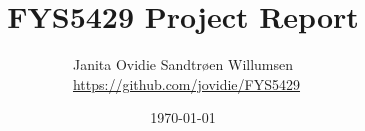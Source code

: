 \documentclass[reprint,english,notitlepage]{revtex4-1}  %
\begin{document}
% 


% 
\title{FYS5429 Project Report}
\author{Janita Ovidie Sandtrøen Willumsen \\ \faGithub \, \url{https://github.com/jovidie/FYS5429}}        
\date{\today}
\noaffiliation
\maketitle


% 
% 
% 
% 
% 
% 


 
\newpage 


% 

\end{document}
